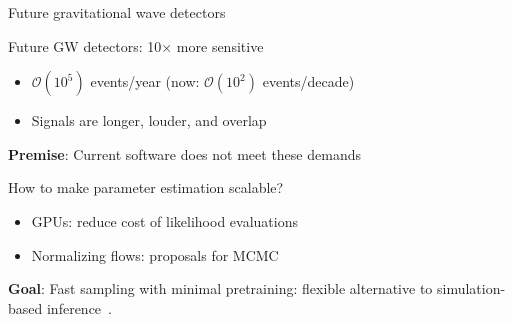 \documentclass[usenames,dvipsnames,t]{beamer}
\begin{document}
\begin{frame}{Future gravitational wave detectors}
  \def\x{5mm}
  \def\y{1mm}

  Future GW detectors: 10$\times$ more sensitive
  \begin{itemize}
    \item $\mathcal{O}(10^5)$ events/year (now: $\mathcal{O}(10^2)$ events/decade)

    \vspace{\y}
    
    \item Signals are longer, louder, and overlap
  \end{itemize}

  \pause

  \begin{tcolorbox}[colback=blue!10, boxrule=0pt]
    \textbf{Premise}: Current software does not meet these demands~\cite{Hu:2024mvn}
  \end{tcolorbox}

  \vspace{\x}

  How to make parameter estimation scalable?
  \begin{itemize}
    \item GPUs: reduce cost of likelihood evaluations

    \vspace{\y}

    \item Normalizing flows: proposals for MCMC
  \end{itemize}

  \pause
  \begin{tcolorbox}[colback=blue!10, boxrule=0pt]
    \textbf{Goal}: Fast sampling with minimal pretraining: flexible alternative to simulation-based inference~\cite{Langendorff:2022fzq, Bhardwaj:2023xph, Dax:2024mcn, Hu:2024oen, Santoliquido:2025lot}.
  \end{tcolorbox}
  \vspace{\y}
  
  


\end{frame}
\end{document}
